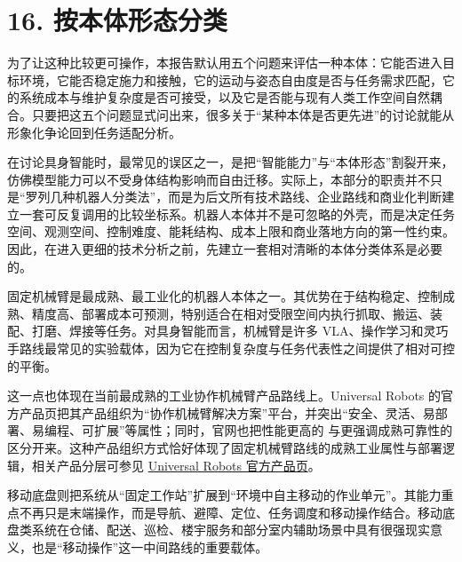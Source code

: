 

\section*{16. 按本体形态分类}

为了让这种比较更可操作，本报告默认用五个问题来评估一种本体：它能否进入目标环境，它能否稳定施力和接触，它的运动与姿态自由度是否与任务需求匹配，它的系统成本与维护复杂度是否可接受，以及它是否能与现有人类工作空间自然耦合。只要把这五个问题显式问出来，很多关于“某种本体是否更先进”的讨论就能从形象化争论回到任务适配分析。

在讨论具身智能时，最常见的误区之一，是把“智能能力”与“本体形态”割裂开来，仿佛模型能力可以不受身体结构影响而自由迁移。实际上，本部分的职责并不只是“罗列几种机器人分类法”，而是为后文所有技术路线、企业路线和商业化判断建立一套可反复调用的比较坐标系。机器人本体并不是可忽略的外壳，而是决定任务空间、观测空间、控制难度、能耗结构、成本上限和商业落地方向的第一性约束。因此，在进入更细的技术分析之前，先建立一套相对清晰的本体分类体系是必要的。

固定机械臂是最成熟、最工业化的机器人本体之一。其优势在于结构稳定、控制成熟、精度高、部署成本可预测，特别适合在相对受限空间内执行抓取、搬运、装配、打磨、焊接等任务。对具身智能而言，机械臂是许多 VLA、操作学习和灵巧手路线最常见的实验载体，因为它在控制复杂度与任务代表性之间提供了相对可控的平衡。

这一点也体现在当前最成熟的工业协作机械臂产品路线上。Universal Robots 的官方产品页把其产品组织为“协作机械臂解决方案”平台，并突出“安全、灵活、易部署、易编程、可扩展”等属性；同时，官网也把性能更高的 \texttt{} 与更强调成熟可靠性的 \texttt{} 区分开来。这种产品组织方式恰好体现了固定机械臂路线的成熟工业属性与部署逻辑，相关产品分层可参见 \href{https://www.universal-robots.com/products/}{Universal Robots 官方产品页}。

移动底盘则把系统从“固定工作站”扩展到“环境中自主移动的作业单元”。其能力重点不再只是末端操作，而是导航、避障、定位、任务调度和移动操作结合。移动底盘类系统在仓储、配送、巡检、楼宇服务和部分室内辅助场景中具有很强现实意义，也是“移动操作”这一中间路线的重要载体。

